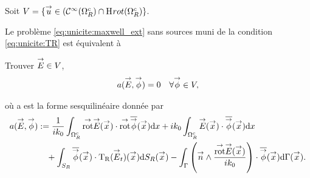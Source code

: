   Soit \(V = \lbrace \vect{u} \in (\mathcal{C}^\infty(\OO^c_R)\cap\Sobolev[rot](\OO^c_R) \rbrace\).

  Le problème \eqref{eq:unicite:maxwell_ext} sans sources muni de la condition \eqref{eq:unicite:TR} est équivalent à
  \begin{prop}
    Trouver \(\vE \in V\),
    \begin{align*}
      a(\vE,\vect\phi) = 0 && \forall \vect \phi \in V,
    \end{align*}

    où a est la forme sesquilinéaire donnée par
    \begin{equation*}
      \begin{aligned}
      a(\vE,\vect\phi) &:=  \frac{1}{ik_0} \int_{\OO^c_R} \trot \vE(\vx) \cdot \trot \conj{\vect{\phi}}(\vx) \dd{x} + ik_0\int_{\OO^c_R}\vE(\vx)\cdot\conj{\vect{\phi}}(\vx) \dd{x}
        \\ 
        & \quad + \int_{S_R} \conj{ \vect \phi }(\vx) \cdot \Tr(\vE_t)(\vx) \dd{S_R}(\vx) - \int_\Gamma \left(\vn \pvect \frac{\trot \vE(\vx)}{ik_0}\right) \cdot \conj{\vect \phi} (\vx) \dd{\Gamma}(\vx).
      \end{aligned}
    \end{equation*}
  \end{prop}

